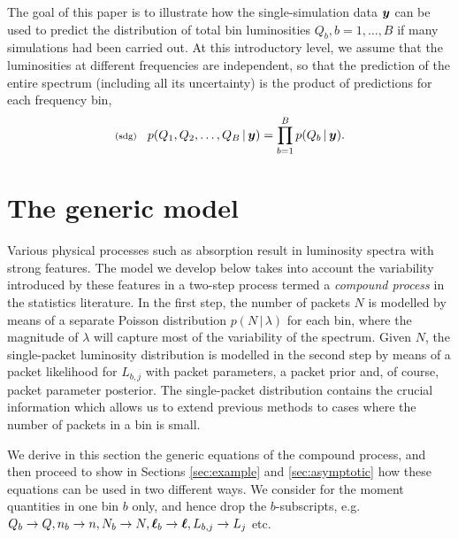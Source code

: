 \documentclass[11pt]{article}
\newcommand{\fred}[1]{\todo[color=orange!40,inline]{#1}} %
\newcommand{\lleq}[1]{\label{#1} }
\renewcommand{\lleq}[1]{\label{#1} {\scriptstyle {\rm (#1)}} \hspace*{2ex} }
\newcommand{\cond}{\,|\,}
\newcommand{\Lum}{L}
\begin{document}
The goal of this paper is to illustrate how the single-simulation data
${\bm{y}}$ can be used to predict the distribution of total bin
luminosities $Q_b, b = 1,\ldots,B$ if many simulations had been
carried out. At this introductory level, we assume that the
luminosities at different frequencies are independent, so that the
prediction of the entire spectrum (including all its uncertainty) is
the product of predictions for each frequency bin,
\begin{align}
  \lleq{sdg}
  p(Q_1,Q_2,\ldots,Q_B\cond\bmy) = \prod_{b=1}^B p(Q_b\cond \bmy).
\end{align}

\section{The generic model} \label{sec:model}

Various physical processes such as absorption result in luminosity
spectra with strong features. The model we develop below takes into
account the variability introduced by these features in a two-step
process termed a \textit{compound process} in the statistics
literature.
%
In the first step, the number of packets $N$ is modelled by means of a
separate Poisson distribution $p(N\cond\lambda)$ for each bin, where
the magnitude of $\lambda$ will capture most of the variability of the
spectrum. Given $N$, the single-packet luminosity distribution is
modelled in the second step by means of a packet likelihood for
$\Lum_{b,j}$ with packet parameters, a packet prior and, of course,
packet parameter posterior. The single-packet distribution contains
the crucial information which allows us to extend previous methods to
cases where the number of packets in a bin is small.
\fred{Refs: Zech, maybe others, too}


We derive in this section the generic equations of the compound
process, and then proceed to show in Sections \ref{sec:example} and
\ref{sec:asymptotic} how these equations can be used in two different
ways.
%
We consider for the moment quantities in one bin $b$ only, and hence
drop the $b$-subscripts, e.g.\
$Q_b \to Q, n_b \to n, N_b\to N, {\bm{\ell}}_b\to{\bm{\ell}}, L_{b,j} \to L_j$ etc.
\end{document}
